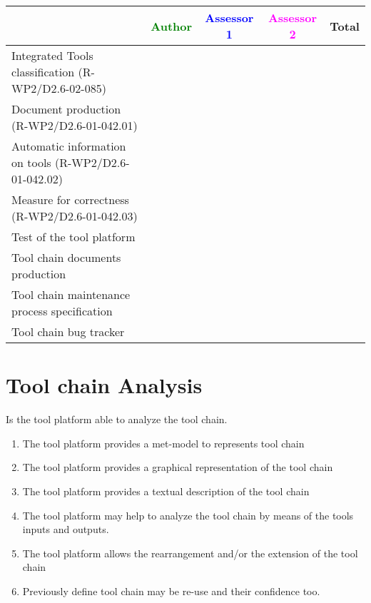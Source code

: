 \begin{tabular}{|l | c | c | c | c|} \hline
  & \textcolor{green}{Author} & \textcolor{blue}{Assessor 1} &  \textcolor{magenta}{Assessor 2} & Total \\
  \hline Integrated Tools classification (R-WP2/D2.6-02-085)  &
  &                 &                  &\\
  \hline Document production (R-WP2/D2.6-01-042.01) &
  &                 &                  &\\
  \hline Automatic information on tools (R-WP2/D2.6-01-042.02) &
  &                 &                  &\\
  \hline Measure for correctness (R-WP2/D2.6-01-042.03) &
  &                 &                  &\\
  \hline Test of the tool platform &
  &                 &                  &\\
  \hline Tool chain documents  production &
  &                 &                  &\\
  \hline Tool chain maintenance process specification &
  &                 &                  &\\
 \hline Tool chain bug tracker &
  &                 &                  &\\
  \hline
\end{tabular}

\section{Tool chain Analysis}
Is the tool platform able to analyze the tool chain.
\begin{enumerate}
\item The tool platform provides a met-model to represents tool chain
\item The tool platform provides a graphical representation of the
  tool chain
\item The tool platform provides a textual description of the
  tool chain
\item The tool platform may help to analyze the tool chain by means
  of the tools inputs and outputs.
\item The tool platform allows the rearrangement and/or the extension
  of the tool chain
\item Previously define tool chain may be re-use and their confidence too.
\end{enumerate}

